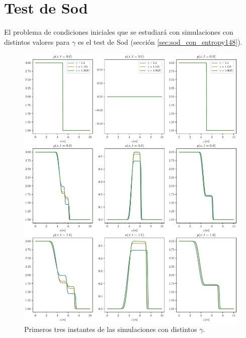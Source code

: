 \section{Test de Sod}
El problema de condiciones iniciales que se estudiará con simulaciones con distintos valores para $\gamma$ es el test de Sod (sección \ref{sec:sod_con_entropy148}).
\begin{figure}[H]
	\includegraphics[width=\linewidth]{../euler1D/experimentos/graficas_sod/1.pdf}
	\caption{Primeros tres instantes de las simulaciones con distintos $\gamma$.}
\end{figure}
